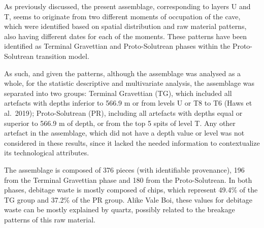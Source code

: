 \documentclass[12pt,twoside]{reedthesis}
\begin{document}
As previously discussed, the present assemblage, corresponding to layers U and T, seems to originate from two different moments of occupation of the cave, which were identified based on spatial distribution and raw material patterns, also having different dates for each of the moments. These patterns have been identified as Terminal Gravettian and Proto-Solutrean phases within the Proto-Solutrean transition model.

As such, and given the patterns, although the assemblage was analysed as a whole, for the statistic descriptive and multivariate analysis, the assemblage was separated into two groups: Terminal Gravettian (TG), which included all artefacts with depths inferior to 566.9 m or from levels U or T8 to T6 (Haws et al.~2019); Proto-Solutrean (PR), including all artefacts with depths equal or superior to 566.9 m of depth, or from the top 5 spits of level T. Any other artefact in the assemblage, which did not have a depth value or level was not considered in these results, since it lacked the needed information to contextualize its technological attributes.

The assemblage is composed of 376 pieces (with identifiable provenance), 196 from the Terminal Gravettian phase and 180 from the Proto-Solutrean. In both phases, debitage waste is mostly composed of chips, which represent 49.4\% of the TG group and 37.2\% of the PR group. Alike Vale Boi, these values for debitage waste can be mostly explained by quartz, possibly related to the breakage patterns of this raw material.
\end{document}
